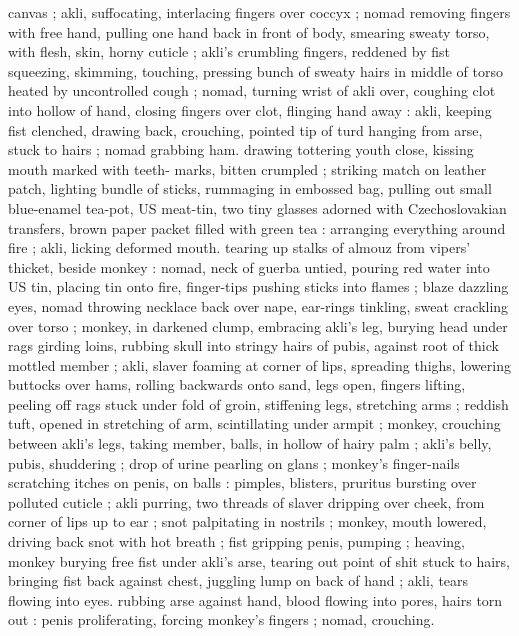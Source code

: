 canvas ; akli, suffocating, interlacing fingers over coccyx ; nomad 
removing fingers with free hand, pulling one hand back in front of 
body, smearing sweaty torso, with flesh, skin, horny cuticle ; akli's 
crumbling fingers, reddened by fist squeezing, skimming, touching, 
pressing bunch of sweaty hairs in middle of torso heated by 
uncontrolled cough ; nomad, turning wrist of akli over, coughing clot 
into hollow of hand, closing fingers over clot, flinging hand away : 
akli, keeping fist clenched, drawing back, crouching, pointed tip of 
turd hanging from arse, stuck to hairs ; nomad grabbing ham. 
drawing tottering youth close, kissing mouth marked with teeth- 
marks, bitten crumpled ; striking match on leather patch, lighting 
bundle of sticks, rummaging in embossed bag, pulling out small 
blue-enamel tea-pot, US meat-tin, two tiny glasses adorned with 
Czechoslovakian transfers, brown paper packet filled with green tea 
: arranging everything around fire ; akli, licking deformed mouth. 
tearing up stalks of almouz from vipers' thicket, beside monkey : 
nomad, neck of guerba untied, pouring red water into US tin, placing 
tin onto fire, finger-tips pushing sticks into flames ; blaze dazzling 
eyes, nomad throwing necklace back over nape, ear-rings tinkling, 
sweat crackling over torso ; monkey, in darkened clump, embracing 
akli's leg, burying head under rags girding loins, rubbing skull into 
stringy hairs of pubis, against root of thick mottled member ; akli, 
slaver foaming at corner of lips, spreading thighs, lowering buttocks 
over hams, rolling backwards onto sand, legs open, fingers lifting, 
peeling off rags stuck under fold of groin, stiffening legs, stretching 
arms ; reddish tuft, opened in stretching of arm, scintillating under 
armpit ; monkey, crouching between akli's legs, taking member, balls, 
in hollow of hairy palm ; akli's belly, pubis, shuddering ; drop of 
urine pearling on glans ; monkey's finger-nails scratching itches on 
penis, on balls : pimples, blisters, pruritus bursting over polluted 
cuticle ; akli purring, two threads of slaver dripping over cheek, from 
corner of lips up to ear ; snot palpitating in nostrils ; monkey, mouth 
lowered, driving back snot with hot breath ; fist gripping penis, 
pumping ; heaving, monkey burying free fist under akli's arse, 
tearing out point of shit stuck to hairs, bringing fist back against 
chest, juggling lump on back of hand ; akli, tears flowing into eyes. 
rubbing arse against hand, blood flowing into pores, hairs torn out : 
penis proliferating, forcing monkey's fingers ; nomad, crouching. 
